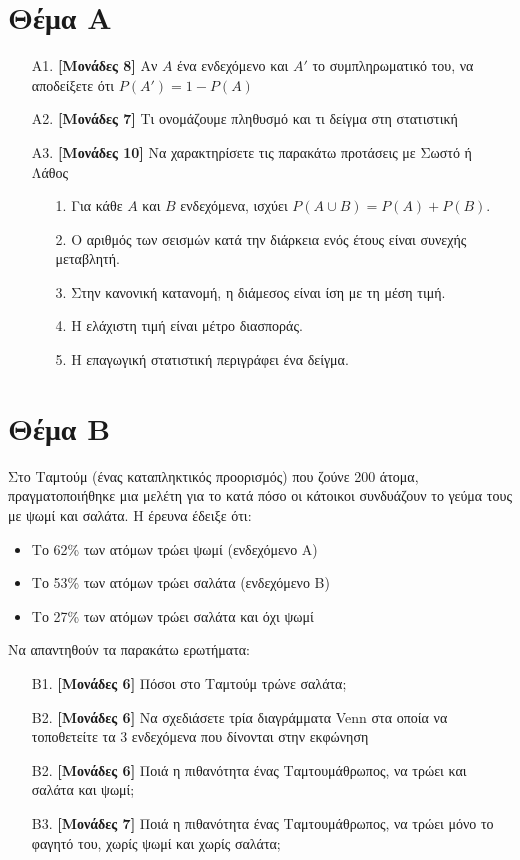 \documentclass[12pt]{article}
\begin{document}
\section*{Θέμα Α}
\begin{enumerate}
 \item[Α1.] \textbf{[Μονάδες 8]} Αν $Α$ ένα ενδεχόμενο και $Α'$ το συμπληρωματικό του, να αποδείξετε ότι $P(Α')=1-P(Α)$
 \item[Α2.] \textbf{[Μονάδες 7]} Τι ονομάζουμε πληθυσμό και τι δείγμα στη στατιστική
 \item[Α3.] \textbf{[Μονάδες 10]} Να χαρακτηρίσετε τις παρακάτω προτάσεις με Σωστό ή Λάθος

 \begin{enumerate}
  \item[1.] Για κάθε $A$ και $B$ ενδεχόμενα, ισχύει $P(A\cup B)=P(A)+P(B)$.
  \item[2.] Ο αριθμός των σεισμών κατά την διάρκεια ενός έτους είναι συνεχής μεταβλητή.
  \item[3.] Στην κανονική κατανομή, η διάμεσος είναι ίση με τη μέση τιμή.
  \item[4.] Η ελάχιστη τιμή είναι μέτρο διασποράς.
  \item[5.] Η επαγωγική στατιστική περιγράφει ένα δείγμα.
 \end{enumerate}
\end{enumerate}

\section*{Θέμα Β}
Στο Ταμτούμ (ένας καταπληκτικός προορισμός) που ζούνε 200 άτομα, πραγματοποιήθηκε μια μελέτη για το κατά πόσο οι κάτοικοι συνδυάζουν το γεύμα τους με ψωμί και σαλάτα. Η έρευνα έδειξε ότι:
\begin{itemize}
 \item Το 62\% των ατόμων τρώει ψωμί (ενδεχόμενο Α)
 \item Το 53\% των ατόμων τρώει σαλάτα (ενδεχόμενο Β)
 \item Το 27\% των ατόμων τρώει σαλάτα και όχι ψωμί
\end{itemize}
Να απαντηθούν τα παρακάτω ερωτήματα:
\begin{enumerate}
 \item[Β1.] \textbf{[Μονάδες 6]} Πόσοι στο Ταμτούμ τρώνε σαλάτα;
 \item[Β2.] \textbf{[Μονάδες 6]} Να σχεδιάσετε τρία διαγράμματα Venn στα οποία να τοποθετείτε τα 3 ενδεχόμενα που δίνονται στην εκφώνηση
 \item[Β2.] \textbf{[Μονάδες 6]} Ποιά η πιθανότητα ένας Ταμτουμάθρωπος, να τρώει και σαλάτα και ψωμί;
 \item[Β3.] \textbf{[Μονάδες 7]} Ποιά η πιθανότητα ένας Ταμτουμάθρωπος, να τρώει μόνο το φαγητό του, χωρίς ψωμί και χωρίς σαλάτα;
\end{enumerate}
\end{document}
